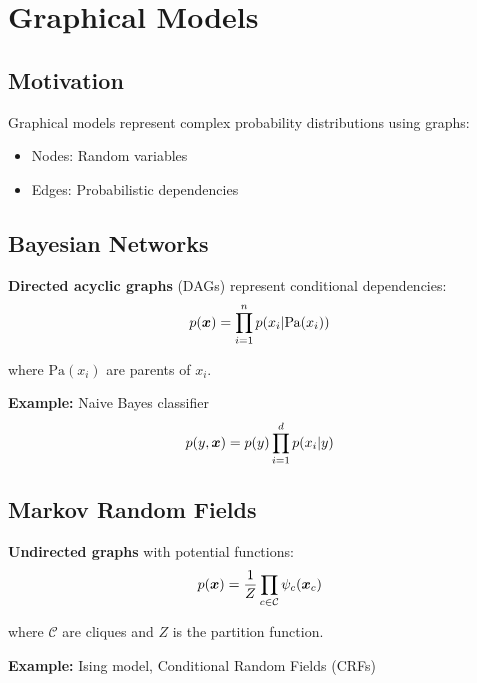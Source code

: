 
\section{Graphical Models }
\label{sec:graphical-models}

\subsection{Motivation}

Graphical models represent complex probability distributions using graphs:
\begin{itemize}
    \item Nodes: Random variables
    \item Edges: Probabilistic dependencies
\end{itemize}

\subsection{Bayesian Networks}

\textbf{Directed acyclic graphs} (DAGs) represent conditional dependencies:
\begin{equation}
p(\boldsymbol{x}) = \prod_{i=1}^{n} p(x_i | \text{Pa}(x_i))
\end{equation}

where $\text{Pa}(x_i)$ are parents of $x_i$.

\textbf{Example:} Naive Bayes classifier
\begin{equation}
p(y, \boldsymbol{x}) = p(y) \prod_{i=1}^{d} p(x_i|y)
\end{equation}

\subsection{Markov Random Fields}

\textbf{Undirected graphs} with potential functions:
\begin{equation}
p(\boldsymbol{x}) = \frac{1}{Z} \prod_{c \in \mathcal{C}} \psi_c(\boldsymbol{x}_c)
\end{equation}

where $\mathcal{C}$ are cliques and $Z$ is the partition function.

\textbf{Example:} Ising model, Conditional Random Fields (CRFs)



